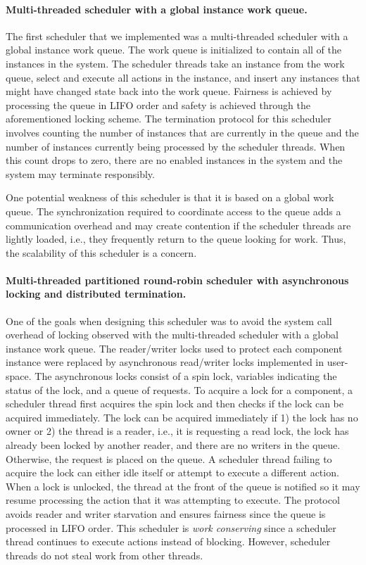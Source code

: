 \paragraph{Multi-threaded scheduler with a global instance work queue.}
The first scheduler that we implemented was a multi-threaded scheduler with a global instance work queue.
The work queue is initialized to contain all of the instances in the system.
The scheduler threads take an instance from the work queue, select and execute all actions in the instance, and insert any instances that might have changed state back into the work queue.
Fairness is achieved by processing the queue in LIFO order and safety is achieved through the aforementioned locking scheme.
The termination protocol for this scheduler involves counting the number of instances that are currently in the queue and the number of instances currently being processed by the scheduler threads.
When this count drops to zero, there are no enabled instances in the system and the system may terminate responsibly.

One potential weakness of this scheduler is that it is based on a global work queue.
The synchronization required to coordinate access to the queue adds a communication overhead and may create contention if the scheduler threads are lightly loaded, i.e., they frequently return to the queue looking for work.
Thus, the scalability of this scheduler is a concern.

\paragraph{Multi-threaded partitioned round-robin scheduler with asynchronous locking and distributed termination.}
One of the goals when designing this scheduler was to avoid the system call overhead of locking observed with the multi-threaded scheduler with a global instance work queue.
The reader/writer locks used to protect each component instance were replaced by asynchronous read/writer locks implemented in user-space.
The asynchronous locks consist of a spin lock, variables indicating the status of the lock, and a queue of requests.
To acquire a lock for a component, a scheduler thread first acquires the spin lock and then checks if the lock can be acquired immediately.
The lock can be acquired immediately if 1) the lock has no owner or 2) the thread is a reader, i.e., it is requesting a read lock, the lock has already been locked by another reader, and there are no writers in the queue.
Otherwise, the request is placed on the queue.
A scheduler thread failing to acquire the lock can either idle itself or attempt to execute a different action.
When a lock is unlocked, the thread at the front of the queue is notified so it may resume processing the action that it was attempting to execute.
The protocol avoids reader and writer starvation and ensures fairness since the queue is processed in LIFO order.
This scheduler is \emph{work conserving} since a scheduler thread continues to execute actions instead of blocking.
However, scheduler threads do not steal work from other threads.

